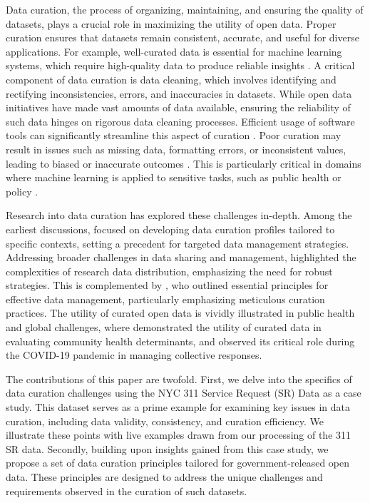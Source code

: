 \documentclass[linenumber]{jdsart}
\begin{document}
Data curation, the process of organizing, maintaining, and ensuring
the quality of datasets, plays a crucial role in maximizing the
utility of open data. Proper curation ensures that datasets remain
consistent, accurate, and useful for diverse applications. For example, 
well-curated data is essential for machine learning systems, which 
require high-quality data to produce reliable insights 
\citep{polyzotis2019data, jain2020overview}. A critical component of 
data curation is data cleaning, which involves identifying and rectifying 
inconsistencies, errors, and inaccuracies in datasets. While open data 
initiatives have made vast amounts of data available, ensuring the 
reliability of such data hinges on rigorous data cleaning processes. 
Efficient usage of software tools can significantly streamline this 
aspect of curation \citep[e.g.,][]{cody2017cody, van2018statistical}. Poor 
curation may result in issues such as missing data, formatting errors, 
or inconsistent values, leading to biased or inaccurate outcomes 
\citep{geiger2020garbage}. This is particularly critical in domains 
where machine learning is applied to sensitive tasks, such as public 
health or policy \citep{rahm2000data}.


Research into data curation has explored these challenges in\mbox{-}depth. 
Among the earliest discussions, \citet{witt2009constructing} focused 
on developing data curation profiles tailored to specific contexts, 
setting a precedent for targeted data management strategies. 
Addressing broader challenges in data sharing and management, 
\citet{borgman2012conundrum} highlighted the complexities of 
research data distribution, emphasizing the need for robust 
strategies. This is complemented by \citet{hart2016ten}, who outlined 
essential principles for effective data management, particularly 
emphasizing meticulous curation practices. The utility of curated 
open data is vividly illustrated in public health and global challenges, 
where \citet{cantor2018facets} demonstrated the utility of curated 
data in evaluating community health determinants, and 
\citet{shankar2021data} observed its critical role during the 
COVID-19 pandemic in managing collective responses.


The contributions of this paper are twofold. First, we delve into
the specifics of data curation challenges using the NYC 311 Service
Request (SR) Data as a case study. This dataset serves as a prime 
example for examining key issues in data curation, including data 
validity, consistency, and curation efficiency. 
We illustrate these points with live examples drawn from our 
processing of the 311 SR data. Secondly, building upon insights 
gained from this case study, we propose a set of data curation 
principles tailored for government-released open data. These 
principles are designed to address the unique challenges 
and requirements observed in the curation of such datasets.
\end{document}
